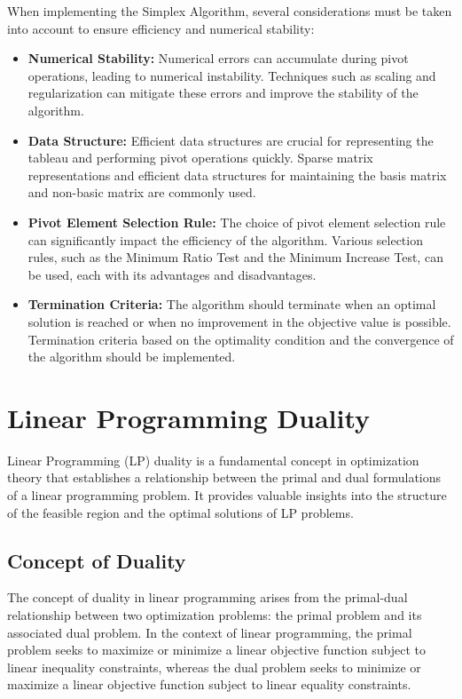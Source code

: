 \documentclass[12pt]{book} %
\begin{document}
When implementing the Simplex Algorithm, several considerations must be taken into account to ensure efficiency and numerical stability:

\begin{itemize}
    \item \textbf{Numerical Stability:} Numerical errors can accumulate during pivot operations, leading to numerical instability. Techniques such as scaling and regularization can mitigate these errors and improve the stability of the algorithm.
    \item \textbf{Data Structure:} Efficient data structures are crucial for representing the tableau and performing pivot operations quickly. Sparse matrix representations and efficient data structures for maintaining the basis matrix and non-basic matrix are commonly used.
    \item \textbf{Pivot Element Selection Rule:} The choice of pivot element selection rule can significantly impact the efficiency of the algorithm. Various selection rules, such as the Minimum Ratio Test and the Minimum Increase Test, can be used, each with its advantages and disadvantages.
    \item \textbf{Termination Criteria:} The algorithm should terminate when an optimal solution is reached or when no improvement in the objective value is possible. Termination criteria based on the optimality condition and the convergence of the algorithm should be implemented.
\end{itemize}


\section{Linear Programming Duality}
Linear Programming (LP) duality is a fundamental concept in optimization theory that establishes a relationship between the primal and dual formulations of a linear programming problem. It provides valuable insights into the structure of the feasible region and the optimal solutions of LP problems.

\subsection{Concept of Duality}
The concept of duality in linear programming arises from the primal-dual relationship between two optimization problems: the primal problem and its associated dual problem. In the context of linear programming, the primal problem seeks to maximize or minimize a linear objective function subject to linear inequality constraints, whereas the dual problem seeks to minimize or maximize a linear objective function subject to linear equality constraints.
\end{document}

